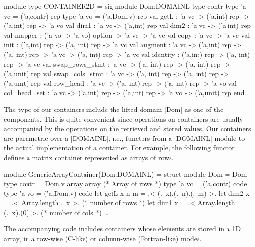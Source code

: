 \documentclass{elsart}
\begin{document}
\begin{code}
module type CONTAINER2D = sig
  module Dom:DOMAINL
  type contr
  type 'a vc = ('a,contr) rep
  type 'a vo = ('a,Dom.v) rep
  val getL : 'a vc -> ('a,int) rep -> ('a,int) rep -> 'a vo
  val dim1 : 'a vc -> ('a,int) rep
  val dim2 : 'a vc -> ('a,int) rep
  val mapper : ('a vo -> 'a vo) option -> 'a vc -> 'a vc
  val copy : 'a vc -> 'a vc
  val init : ('a,int) rep -> ('a, int) rep -> 'a vc
  val augment : 'a vc -> ('a,int) rep -> ('a, int) rep -> 'a vc ->
                ('a, int) rep -> 'a vc
  val identity : ('a,int) rep -> ('a, int) rep -> 'a vc
  val swap_rows_stmt : 'a vc -> ('a, int) rep -> ('a, int) rep -> 
                       ('a,unit) rep
  val swap_cols_stmt : 'a vc -> ('a, int) rep -> ('a, int) rep -> 
                       ('a,unit) rep
  val row_head : 'a vc -> ('a, int) rep -> ('a, int) rep -> 'a vo
  val col_head_set : 'a vc -> ('a,int) rep -> ('a,int) rep -> 'a vo -> 
            ('a,unit) rep
end
\end{code}

The type of our containers include the lifted domain |Dom| as one of
the components. This is quite convenient since operations on containers
are usually accompanied by the operations on the retrieved and stored
values. Our containers are parametric over a |DOMAINL|, i.e., functors
from a |DOMAINL| module to the actual implementation of a
container. For example, the following functor defines a matrix
container represented as arrays of rows.

\begin{code}
module GenericArrayContainer(Dom:DOMAINL) =
  struct
  module Dom = Dom
  type contr = Dom.v array array (* Array of rows *)
  type 'a vc = ('a,contr) code
  type 'a vo = ('a,Dom.v) code
  let getL x n m = .< (.~x).(.~n).(.~m) >.
  let dim2 x = .< Array.length .~x >.       (* number of rows *)
  let dim1 x = .< Array.length (.~x).(0) >. (* number of cols *)
  \dots
\end{code}
%
The accompanying code\cite{metamonadsURL} includes containers whose
elements are stored in a 1D array, in a
row-wise (C-like) or column-wise (Fortran-like) modes.
\end{document}
